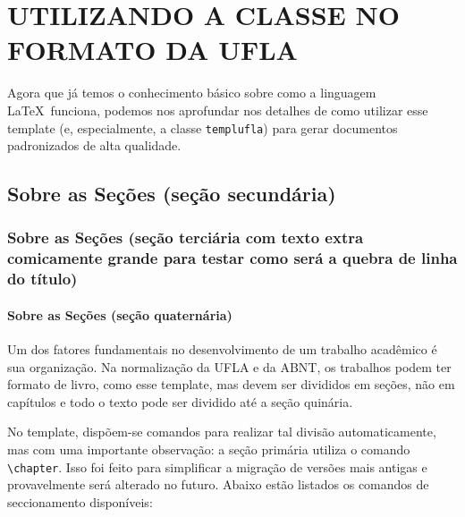 \chapter{\MakeUppercase{Utilizando a Classe no Formato da UFLA}}\label{sec:template}

Agora que já temos o conhecimento básico sobre como a linguagem \LaTeX\ funciona, podemos nos aprofundar nos detalhes de como utilizar esse template (e, especialmente, a classe \texttt{templufla}) para gerar documentos padronizados de alta qualidade.

\section{Sobre as Seções (seção secundária)}\label{sec2:secoes}
\subsection{Sobre as Seções (seção terciária com texto extra comicamente grande para testar como será a quebra de linha do título)}\label{sec3:teste}
\subsubsection{Sobre as Seções (seção quaternária)}\label{sec4:teste}
\label{sec5:teste}

Um dos fatores fundamentais no desenvolvimento de um trabalho acadêmico é sua organização. Na normalização da UFLA e da ABNT, os trabalhos podem ter formato de livro, como esse template, mas devem ser divididos em seções, não em capítulos e todo o texto pode ser dividido até a seção quinária.

No template, dispõem-se comandos para realizar tal divisão automaticamente, mas com uma importante observação: a seção primária utiliza o comando \verb|\chapter|. Isso foi feito para simplificar a migração de versões mais antigas e provavelmente será alterado no futuro. Abaixo estão listados os comandos de seccionamento disponíveis: 

